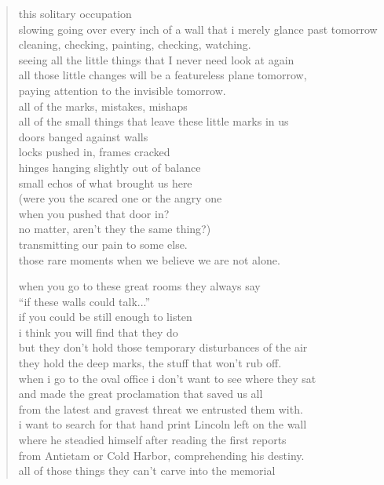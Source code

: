 \begin{verse}
this solitary occupation \\
slowing going over every inch of a wall that i merely glance past tomorrow \\
cleaning, checking, painting, checking, watching. \\
seeing all the little things that I never need look at again \\
all those little changes will be a featureless plane tomorrow, \\
paying attention to the invisible tomorrow. \\
all of the marks, mistakes, mishaps \\
all of the small things that leave these little marks in us \\
doors banged against walls \\
locks pushed in, frames cracked \\
hinges hanging slightly out of balance \\
small echos of what brought us here \\
(were you the scared one or the angry one  \\
when you pushed that door in? \\
no matter, aren’t they the same thing?) \\
transmitting our pain to some else.  \\
those rare moments when we believe we are not alone.

when you go to these great rooms they always say \\
``if these walls could talk...'' \\
if you could be still enough to listen \\
i think you will find that they do \\
but they don’t hold those temporary disturbances of the air \\
they hold the deep marks, the stuff that won’t rub off. \\
when i go to the oval office i don’t want to see where they sat \\
and made the great proclamation that saved us all \\
from the latest and gravest threat we entrusted them with. \\
i want to search for that hand print Lincoln left on the wall \\
where he steadied himself after reading the first reports \\
from Antietam or Cold Harbor, comprehending his destiny. \\
all of those things they can’t carve into the memorial
\end{verse}
